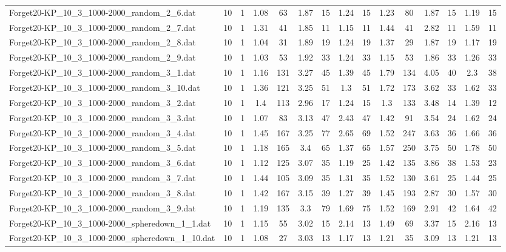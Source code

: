 \begin{table}[!ht]
{\begin{tabular}{lcccccccccccccc}
Forget20-KP\_10\_3\_1000-2000\_random\_2\_6.dat & 10 & 1 & 1.08 & 63 & 1.87 & 15 & 1.24 & 15 & 1.23 & 80 & 1.87 & 15 & 1.19 & 15 \\
Forget20-KP\_10\_3\_1000-2000\_random\_2\_7.dat & 10 & 1 & 1.31 & 41 & 1.85 & 11 & 1.15 & 11 & 1.44 & 41 & 2.82 & 11 & 1.59 & 11 \\
Forget20-KP\_10\_3\_1000-2000\_random\_2\_8.dat & 10 & 1 & 1.04 & 31 & 1.89 & 19 & 1.24 & 19 & 1.37 & 29 & 1.87 & 19 & 1.17 & 19 \\
Forget20-KP\_10\_3\_1000-2000\_random\_2\_9.dat & 10 & 1 & 1.03 & 53 & 1.92 & 33 & 1.24 & 33 & 1.15 & 53 & 1.86 & 33 & 1.26 & 33 \\
Forget20-KP\_10\_3\_1000-2000\_random\_3\_1.dat & 10 & 1 & 1.16 & 131 & 3.27 & 45 & 1.39 & 45 & 1.79 & 134 & 4.05 & 40 & 2.3 & 38 \\
Forget20-KP\_10\_3\_1000-2000\_random\_3\_10.dat & 10 & 1 & 1.36 & 121 & 3.25 & 51 & 1.3 & 51 & 1.72 & 173 & 3.62 & 33 & 1.62 & 33 \\
Forget20-KP\_10\_3\_1000-2000\_random\_3\_2.dat & 10 & 1 & 1.4 & 113 & 2.96 & 17 & 1.24 & 15 & 1.3 & 133 & 3.48 & 14 & 1.39 & 12 \\
Forget20-KP\_10\_3\_1000-2000\_random\_3\_3.dat & 10 & 1 & 1.07 & 83 & 3.13 & 47 & 2.43 & 47 & 1.42 & 91 & 3.54 & 24 & 1.62 & 24 \\
Forget20-KP\_10\_3\_1000-2000\_random\_3\_4.dat & 10 & 1 & 1.45 & 167 & 3.25 & 77 & 2.65 & 69 & 1.52 & 247 & 3.63 & 36 & 1.66 & 36 \\
Forget20-KP\_10\_3\_1000-2000\_random\_3\_5.dat & 10 & 1 & 1.18 & 165 & 3.4 & 65 & 1.37 & 65 & 1.57 & 250 & 3.75 & 50 & 1.78 & 50 \\
Forget20-KP\_10\_3\_1000-2000\_random\_3\_6.dat & 10 & 1 & 1.12 & 125 & 3.07 & 35 & 1.19 & 25 & 1.42 & 135 & 3.86 & 38 & 1.53 & 23 \\
Forget20-KP\_10\_3\_1000-2000\_random\_3\_7.dat & 10 & 1 & 1.44 & 105 & 3.09 & 35 & 1.31 & 35 & 1.52 & 130 & 3.61 & 25 & 1.44 & 25 \\
Forget20-KP\_10\_3\_1000-2000\_random\_3\_8.dat & 10 & 1 & 1.42 & 167 & 3.15 & 39 & 1.27 & 39 & 1.45 & 193 & 2.87 & 30 & 1.57 & 30 \\
Forget20-KP\_10\_3\_1000-2000\_random\_3\_9.dat & 10 & 1 & 1.19 & 135 & 3.3 & 79 & 1.69 & 75 & 1.52 & 169 & 2.91 & 42 & 1.64 & 42 \\
Forget20-KP\_10\_3\_1000-2000\_spheredown\_1\_1.dat & 10 & 1 & 1.15 & 55 & 3.02 & 15 & 2.14 & 13 & 1.49 & 69 & 3.37 & 15 & 2.16 & 13 \\
Forget20-KP\_10\_3\_1000-2000\_spheredown\_1\_10.dat & 10 & 1 & 1.08 & 27 & 3.03 & 13 & 1.17 & 13 & 1.21 & 35 & 3.09 & 13 & 1.21 & 13 \\

\end{tabular}}
\end{table}

